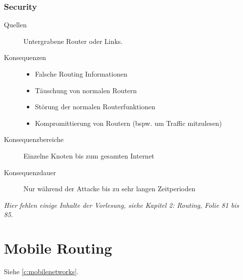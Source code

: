 			\subsubsection{Security} %
				\begin{description}
					\item[Quellen] Untergrabene Router oder Links.
					\item[Konsequenzen]
						\begin{itemize}
							\item Falsche Routing Informationen
							\item Täuschung von normalen Routern
							\item Störung der normalen Routerfunktionen
							\item Kompromittierung von Routern (bspw. um Traffic mitzulesen)
						\end{itemize}
					\item[Konsequenzbereiche] Einzelne Knoten bis zum gesamten Internet
					\item[Konsequenzdauer] Nur während der Attacke bis zu sehr langen Zeitperioden
				\end{description}

				\textit{Hier fehlen einige Inhalte der Vorlesung, siehe Kapitel 2: Routing, Folie 81 bis 85.}

	\section{Mobile Routing}
		Siehe \ref{c:mobilenetworks}.

